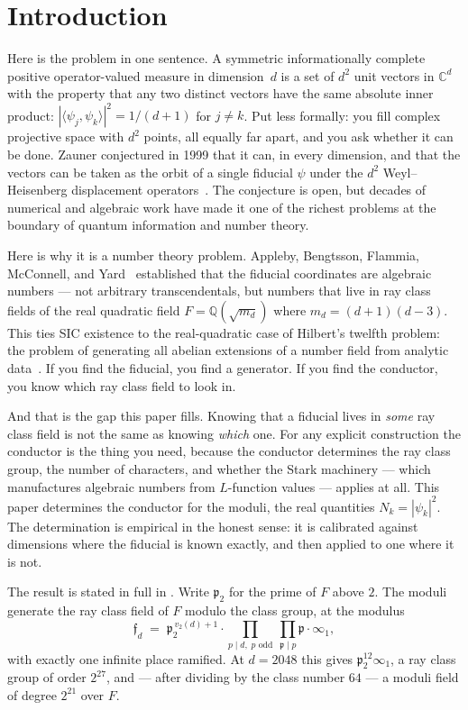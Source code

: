 \documentclass[12pt,a4paper]{article}
\newcommand{\Fd}{F}
\newcommand{\md}{m_d}
\newcommand{\pt}{\mathfrak{p}_2}
\begin{document}
\section{Introduction}
\label{sec:intro}

Here is the problem in one sentence. A symmetric informationally complete positive operator-valued measure in dimension~$d$ is a set of $d^2$ unit vectors in $\mathbb{C}^d$ with the property that any two distinct vectors have the same absolute inner product: $|\langle\psi_j,\psi_k\rangle|^2 = 1/(d+1)$ for $j \neq k$. Put less formally: you fill complex projective space with $d^2$ points, all equally far apart, and you ask whether it can be done. Zauner conjectured in 1999 that it can, in every dimension, and that the vectors can be taken as the orbit of a single fiducial $\psi$ under the $d^2$ Weyl--Heisenberg displacement operators~\cite{Zauner1999}. The conjecture is open, but decades of numerical and algebraic work have made it one of the richest problems at the boundary of quantum information and number theory.

Here is why it is a number theory problem. Appleby, Bengtsson, Flammia, McConnell, and Yard~\cite{Appleby2013,Appleby2017,AFMY2020} established that the fiducial coordinates are algebraic numbers — not arbitrary transcendentals, but numbers that live in ray class fields of the real quadratic field $\Fd = \mathbb{Q}(\sqrt{\md})$ where $\md = (d+1)(d-3)$. This ties SIC existence to the real-quadratic case of Hilbert's twelfth problem: the problem of generating all abelian extensions of a number field from analytic data~\cite{StarkHilbert12}. If you find the fiducial, you find a generator. If you find the conductor, you know which ray class field to look in.

And that is the gap this paper fills. Knowing that a fiducial lives in \emph{some} ray class field is not the same as knowing \emph{which} one. For any explicit construction the conductor is the thing you need, because the conductor determines the ray class group, the number of characters, and whether the Stark machinery — which manufactures algebraic numbers from $L$-function values — applies at all. This paper determines the conductor for the moduli, the real quantities $N_k = |\psi_k|^2$. The determination is empirical in the honest sense: it is calibrated against dimensions where the fiducial is known exactly, and then applied to one where it is not.

The result is stated in full in . Write $\pt$ for the prime of $\Fd$ above $2$. The moduli generate the ray class field of $\Fd$ modulo the class group, at the modulus
\[
\mathfrak{f}_d \;=\; \pt^{\,v_2(d)+1} \cdot \prod_{p \mid d,\; p \text{ odd}}
\ \prod_{\mathfrak{p} \mid p} \mathfrak{p} \cdot \infty_1,
\]
with exactly one infinite place ramified. At $d=2048$ this gives $\pt^{12}\infty_1$, a ray class group of order $2^{27}$, and — after dividing by the class number $64$ — a moduli field of degree $2^{21}$ over $\Fd$.
\end{document}
